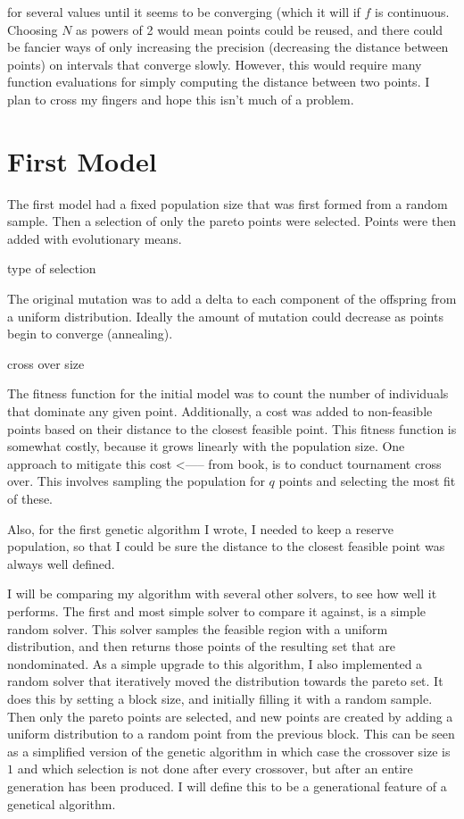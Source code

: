 {{for several values until it seems to be converging (which it will if $f$ is continuous.
Choosing $N$ as powers of 2 would mean points could be reused, and there could be fancier ways of only increasing the precision (decreasing the distance between points) on intervals that
converge slowly.
However, this would require many function evaluations for simply computing the distance between two points.
I plan to cross my fingers and hope this isn't much of a problem.


\section{First Model}

The first model had a fixed population size that was first formed from a random sample.
Then a selection of only the pareto points were selected.
Points were then added with evolutionary means.

type of selection

The original mutation was to add a delta to each component of the offspring from a uniform distribution.
Ideally the amount of mutation could decrease as points begin to converge (annealing).


cross over size

The fitness function for the initial model was to count the number of individuals that dominate any given point.
Additionally, a cost was added to non-feasible points based on their distance to the closest feasible point.
This fitness function is somewhat costly, because it grows linearly with the population size.
One approach to mitigate this cost <----- from book, is to conduct tournament cross over.
This involves sampling the population for $q$ points and selecting the most fit of these.

Also, for the first genetic algorithm I wrote, I needed to keep a reserve population, so that I could be sure the 
distance to the closest feasible point was always well defined.

I will be comparing my algorithm with several other solvers, to see how well it performs.
The first and most simple solver to compare it against, is a simple random solver.
This solver samples the feasible region with a uniform distribution, and then returns those points of the resulting set that are nondominated.
As a simple upgrade to this algorithm, I also implemented a random solver that iteratively moved the distribution towards the pareto set.
It does this by setting a block size, and initially filling it with a random sample.
Then only the pareto points are selected, and new points are created by adding a uniform distribution to a random point from the previous block.
This can be seen as a simplified version of the genetic algorithm in which case the crossover size is $1$ and which selection is not done after every crossover, but after an entire generation has been produced.
I will define this to be a generational feature of a genetical algorithm.

}}
